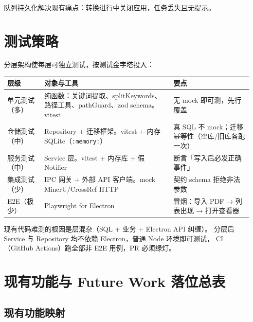 \documentclass[12pt, a4paper]{article}
\begin{document}
队列持久化解决现有痛点：转换进行中关闭应用，任务丢失且无提示。

\section{测试策略}

分层架构使每层可独立测试，按测试金字塔投入：

\begin{center}
\begin{tabular}{p{2.6cm} p{4.6cm} p{5.2cm}}
  \toprule
  \textbf{层级} & \textbf{对象与工具} & \textbf{要点} \\
  \midrule
  单元测试（多） & 纯函数：关键词提取、splitKeywords、路径工具、pathGuard、zod schema。vitest & 无 mock 即可测，先行覆盖 \\
  仓储测试（中） & Repository + 迁移框架。vitest + 内存 SQLite（\texttt{:memory:}） & 真 SQL 不 mock；迁移幂等性（空库/旧库各跑一次） \\
  服务测试（中） & Service 层。vitest + 内存库 + 假 Notifier & 断言「写入后必发正确事件」 \\
  集成测试（少） & IPC 网关 + 外部 API 客户端。mock MinerU/CrossRef HTTP & 契约 schema 拒绝非法参数 \\
  E2E（极少） & Playwright for Electron & 冒烟：导入 PDF → 列表出现 → 打开查看器 \\
  \bottomrule
\end{tabular}
\end{center}

\begin{tcolorbox}[fixbox, title={对策 \#5：解决「零测试覆盖」}]
  现有代码难测的根因是层混杂（SQL + 业务 + Electron API 纠缠）。
  分层后 Service 与 Repository 均不依赖 Electron，普通 Node 环境即可测试，
  CI（GitHub Actions）跑全部非 E2E 用例，PR 必须绿灯。
\end{tcolorbox}

\section{现有功能与 Future Work 落位总表}

\subsection{现有功能映射}
\end{document}
